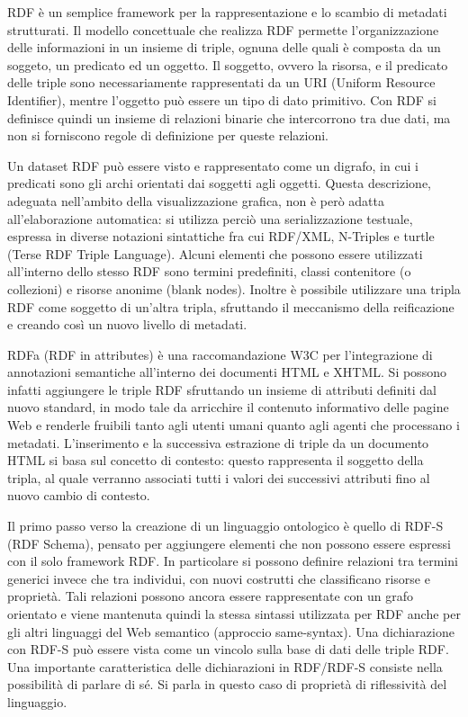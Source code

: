 \documentclass[Lau,binding=0.6cm,noexaminfo,oneside]{sapthesis}
\begin{document}
RDF è un semplice framework per la rappresentazione e lo scambio di metadati strutturati. Il modello concettuale che realizza RDF permette l'organizzazione delle informazioni in un insieme di triple, ognuna delle quali è composta da un soggeto, un predicato ed un oggetto. Il soggetto, ovvero la risorsa, e il predicato delle triple sono necessariamente rappresentati da un URI (Uniform Resource Identifier), mentre l'oggetto può essere un tipo di dato primitivo. Con RDF si definisce quindi un insieme di relazioni binarie che intercorrono tra due dati, ma non si forniscono regole di definizione per queste relazioni.\medskip

Un dataset RDF può essere visto e rappresentato come un digrafo, in cui i predicati sono gli archi orientati dai soggetti agli oggetti. Questa descrizione, adeguata nell'ambito della visualizzazione grafica, non è però adatta all'elaborazione automatica: si utilizza perciò una serializzazione testuale, espressa in diverse notazioni sintattiche fra cui RDF/XML, N-Triples e turtle (Terse RDF Triple Language).
Alcuni elementi che possono essere utilizzati all'interno dello stesso RDF sono termini predefiniti, classi contenitore (o collezioni) e risorse anonime (blank nodes). Inoltre è possibile utilizzare una tripla RDF come soggetto di un'altra tripla, sfruttando il meccanismo della reificazione e creando così un nuovo livello di metadati.\medskip

RDFa (RDF in attributes) è una raccomandazione W3C per l'integrazione di annotazioni semantiche all'interno dei documenti HTML e XHTML. Si possono infatti aggiungere le triple RDF sfruttando un insieme di attributi definiti dal nuovo standard, in modo tale da arricchire il contenuto informativo delle pagine Web e renderle fruibili tanto agli utenti umani quanto agli agenti che processano i metadati.
L'inserimento e la successiva estrazione di triple da un documento HTML si basa sul concetto di contesto: questo rappresenta il soggetto della tripla, al quale verranno associati tutti i valori dei successivi attributi fino al nuovo cambio di contesto.\medskip

Il primo passo verso la creazione di un linguaggio ontologico è quello di RDF-S (RDF Schema), pensato per aggiungere elementi che non possono essere espressi con il solo framework RDF. In particolare si possono definire relazioni tra termini generici invece che tra individui, con nuovi costrutti che classificano risorse e proprietà.
Tali relazioni possono ancora essere rappresentate con un grafo orientato e viene mantenuta quindi la stessa sintassi utilizzata per RDF anche per gli altri linguaggi del Web semantico (approccio same-syntax). Una dichiarazione con RDF-S può essere vista come un vincolo sulla base di dati delle triple RDF. Una importante caratteristica delle dichiarazioni in RDF/RDF-S consiste nella possibilità di parlare di sé. Si parla in questo caso di proprietà di riflessività del linguaggio.\medskip
\end{document}
